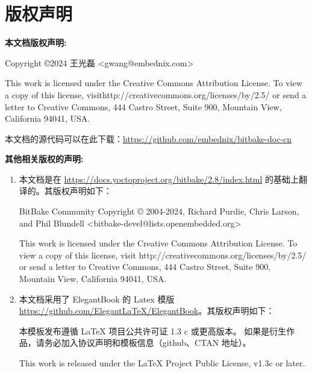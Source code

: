 \chapter*{版权声明}

\textbf{本文档版权声明:}

Copyright \copyright 2024 王光磊 <gwang@embednix.com>

This work is licensed under the Creative Commons Attribution License. To view a copy of this license, visit\linebreak http://creativecommons.org/licenses/by/2.5/ or send a letter to Creative Commons, 444 Castro Street, Suite 900, Mountain View, California 94041, USA.

本文档的源代码可以在此下载：\url{https://github.com/embednix/bitbake-doc-cn}


\textbf{其他相关版权的声明:}

\begin{enumerate}    
\item 本文档是在 \url{https://docs.yoctoproject.org/bitbake/2.8/index.html} 的基础上翻译的。其版权声明如下：

\medskip
BitBake Community
Copyright © 2004-2024, Richard Purdie, Chris Larson, and Phil Blundell\linebreak
<bitbake-devel@lists.openembedded.org>

\medskip
This work is licensed under the Creative Commons Attribution License. To view a copy of this license, visit \linebreak http://creativecommons.org/licenses/by/2.5/ or send a letter to Creative Commons, 444 Castro Street, Suite 900, Mountain View, California 94041, USA.

\medskip
\item 本文档采用了 ElegantBook 的 Latex 模版 \url{https://github.com/ElegantLaTeX/ElegantBook}。其版权声明如下：

\medskip
本模板发布遵循 LaTeX 项目公共许可证 1.3 c 或更高版本。 如果是衍生作品，请务必加入协议声明和模板信息（github、CTAN 地址）。

\medskip
This work is released under the LaTeX Project Public License, v1.3c or later.
\end{enumerate}


